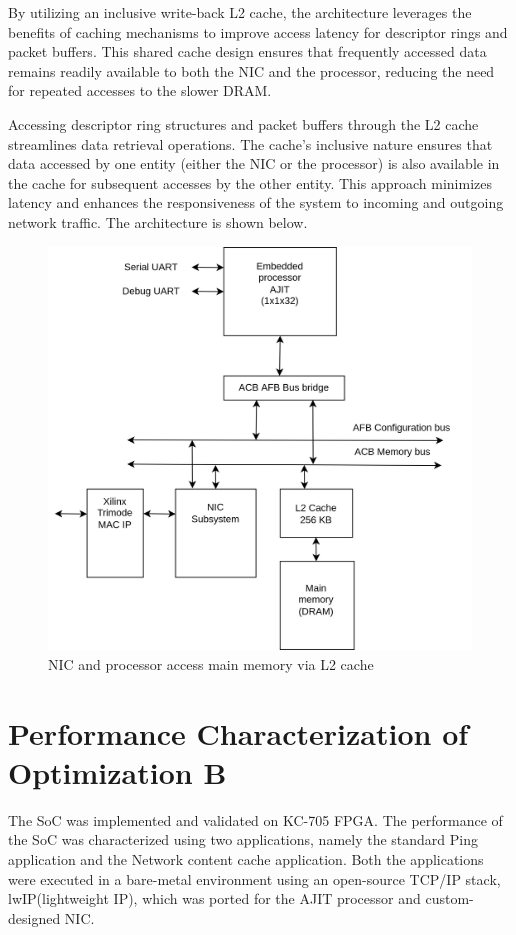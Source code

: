 \documentclass[12pt]{report}
\begin{document}
By utilizing an inclusive write-back L2 cache, the architecture leverages the benefits of caching mechanisms to improve access latency for descriptor rings and packet buffers. This shared cache design ensures that frequently accessed data remains readily available to both the NIC and the processor, reducing the need for repeated accesses to the slower DRAM.

Accessing descriptor ring structures and packet buffers through the L2 cache streamlines data retrieval operations. The cache's inclusive nature ensures that data accessed by one entity (either the NIC or the processor) is also available in the cache for subsequent accesses by the other entity. This approach minimizes latency and enhances the responsiveness of the system to incoming and outgoing network traffic.
The architecture is shown below.

	\begin{figure}[h]
			\centering
			\includegraphics[width=12cm]{../figures/L2Cache_arch.jpg}
			\caption{NIC and processor access main memory via L2 cache}
			\label{fig:NIC-Proc-top-level3}
		\end{figure}
\section{Performance Characterization of Optimization B}
The SoC was implemented and validated on KC-705 FPGA.
The performance of the SoC was characterized using two applications, namely the standard Ping application and the Network content cache application. Both the applications were executed in a bare-metal environment using an open-source TCP/IP stack, lwIP(lightweight IP), which was ported for the AJIT processor and custom-designed NIC. 
\end{document}

